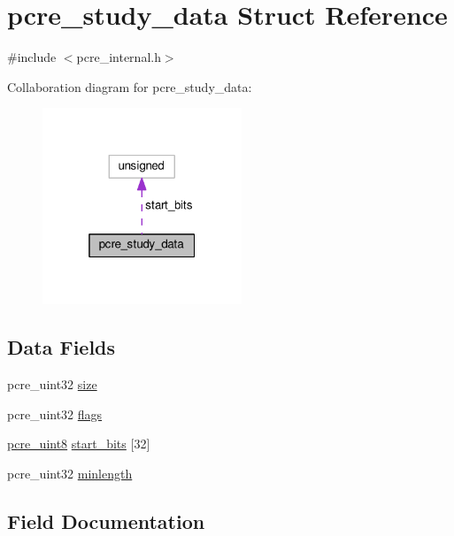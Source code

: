 \hypertarget{structpcre__study__data}{}\section{pcre\+\_\+study\+\_\+data Struct Reference}
\label{structpcre__study__data}


{\ttfamily \#include $<$pcre\+\_\+internal.\+h$>$}



Collaboration diagram for pcre\+\_\+study\+\_\+data\+:
\nopagebreak
\begin{figure}[H]
\begin{center}
\leavevmode
\includegraphics[width=169pt]{structpcre__study__data__coll__graph}
\end{center}
\end{figure}
\subsection*{Data Fields}
\begin{DoxyCompactItemize}
\item 
pcre\+\_\+uint32 \hyperlink{structpcre__study__data_ac994347d3d729eaf14eba590b65867a6}{size}
\item 
pcre\+\_\+uint32 \hyperlink{structpcre__study__data_aa7f0cd71352343074202364478c25a4d}{flags}
\item 
\hyperlink{pcre__internal_8h_a6e9105ffeed09883190f9bf30d93e210}{pcre\+\_\+uint8} \hyperlink{structpcre__study__data_ab4dd0613033fa41c5cd084a98b4c0fb0}{start\+\_\+bits} \mbox{[}32\mbox{]}
\item 
pcre\+\_\+uint32 \hyperlink{structpcre__study__data_a50cb4fc8a227db9bfe3568764aca3274}{minlength}
\end{DoxyCompactItemize}


\subsection{Field Documentation}
